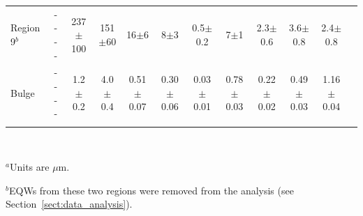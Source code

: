 \begin{table}
\begin{minipage}{200mm}
\begin{tabular}{l c c  c  c  c  c  c  c  c  c c }
 Region 9$^b$ & - - - -                 & 237$\pm$100          & 151$\pm$60        & 16$\pm$6                 & 8$\pm$3                   & 0.5$\pm$0.2             & 7$\pm$1                   & 2.3$\pm$0.6             & 3.6$\pm$0.8                 & 2.4$\pm$0.8  \\
 Bulge       & - - - -                          & 1.2$\pm$0.2            & 4.0$\pm$0.4        & 0.51$\pm$0.07         & 0.30$\pm$0.06        & 0.03$\pm$0.01        & 0.78$\pm$0.03        & 0.22$\pm$0.02        & 0.49$\pm$0.03            & 1.16$\pm$0.04 \\       
\hline
 \label{EQW}
\end{tabular}\\
{$^a$Units are $\mu$m.
 
$^b$EQWs from these two regions were removed from the analysis (see Section~\ref{sect:data_analysis}).}
\end{minipage}
\end{table}





